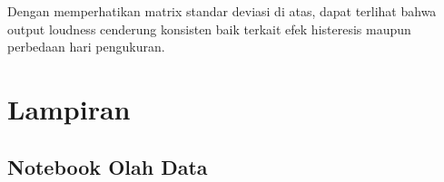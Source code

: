 \documentclass[12pt,]{article}
\begin{document}
	Dengan memperhatikan matrix standar deviasi di atas, dapat terlihat bahwa output loudness cenderung konsisten
	baik terkait efek histeresis maupun perbedaan hari pengukuran.

	\newpage
	\section{Lampiran}

	\subsection{Notebook Olah Data}
	
\end{document}
